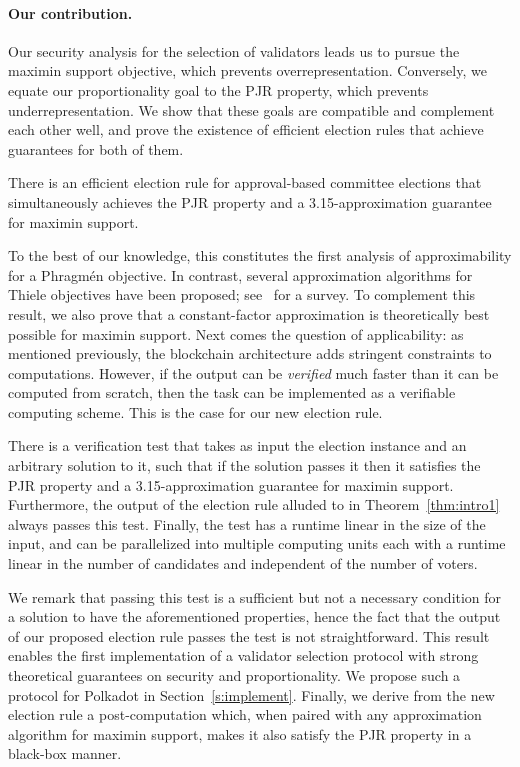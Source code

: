 \paragraph{Our contribution.}
Our security analysis for the selection of validators leads us to pursue the maximin support objective, which prevents overrepresentation. Conversely, we equate our proportionality goal to the PJR property, which prevents underrepresentation. 
We show that these goals are compatible and complement each other well, and prove the existence of efficient election rules that achieve guarantees for both of them. 

\begin{theorem}\label{thm:intro1}
There is an efficient election rule for approval-based committee elections that simultaneously achieves the PJR property and a 3.15-approximation guarantee for maximin support.
\end{theorem}

To the best of our knowledge, this constitutes the first analysis of approximability for a Phragm\'{e}n objective. 
In contrast, several approximation algorithms for Thiele objectives have been proposed; see~\cite{lackner2020approval} for a survey. 
To complement this result, we also prove that a constant-factor approximation is theoretically best possible for maximin support. 
%
Next comes the question of applicability: as mentioned previously, the blockchain architecture adds stringent constraints to computations. However, if the output can be \emph{verified} much faster than it can be computed from scratch, then the task can be implemented as a verifiable computing scheme. This is the case for our new election rule.

\begin{theorem}\label{thm:intro2}
There is a verification test that takes as input the election instance and an arbitrary solution to it, such that if the solution passes it then it satisfies the PJR property and a 3.15-approximation guarantee for maximin support. 
Furthermore, the output of the election rule alluded to in Theorem~\ref{thm:intro1} always passes this test.
Finally, the test has a runtime linear in the size of the input, and can be parallelized into multiple computing units each with a runtime linear in the number of candidates and independent of the number of voters. 
 
\end{theorem}

We remark that passing this test is a sufficient but not a necessary condition for a solution to have the aforementioned properties, hence the fact that the output of our proposed election rule passes the test is not straightforward.
This result enables the first implementation of a validator selection protocol with strong theoretical guarantees on security and proportionality. 
We propose such a protocol for Polkadot in Section~\ref{s:implement}.
%
Finally, we derive from the new election rule a post-computation which, when paired with any approximation algorithm for maximin support, makes it also satisfy the PJR property in a black-box manner.

